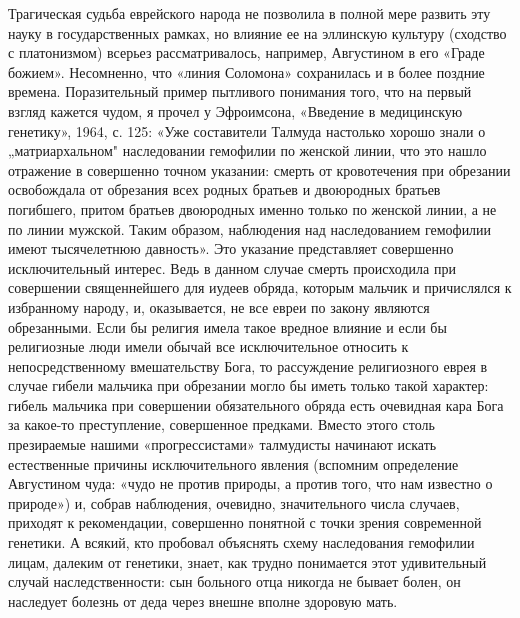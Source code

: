 Трагическая судьба еврейского народа не позволила в полной мере развить эту
науку в государственных рамках, но влияние ее на эллинскую культуру (сходство с
платонизмом) всерьез рассматривалось, например, Августином в его «Граде
божием». Несомненно, что «линия Соломона» сохранилась и в более поздние
времена. Поразительный пример пытливого понимания того, что на первый взгляд
кажется чудом, я прочел у Эфроимсона, «Введение в медицинскую генетику», 1964,
с. 125: «Уже составители Талмуда настолько хорошо знали о „матриархальном"
наследовании гемофилии по женской линии, что это нашло отражение в совершенно
точном указании: смерть от кровотечения при обрезании освобождала от обрезания
всех родных братьев и двоюродных братьев погибшего, притом братьев двоюродных
именно только по женской линии, а не по линии мужской. Таким образом,
наблюдения над наследованием гемофилии имеют тысячелетнюю давность». Это
указание представляет совершенно исключительный интерес. Ведь в данном случае
смерть происходила при совершении священнейшего для иудеев обряда, которым
мальчик и причислялся к избранному народу, и, оказывается, не все евреи по
закону являются обрезанными. Если бы религия имела такое вредное влияние и если
бы религиозные люди имели обычай все исключительное относить к
непосредственному вмешательству Бога, то рассуждение религиозного еврея в
случае гибели мальчика при обрезании могло бы иметь только такой характер:
гибель мальчика при совершении обязательного обряда есть очевидная кара Бога за
какое-то преступление, совершенное предками. Вместо этого столь презираемые
нашими «прогрессистами» талмудисты начинают искать естественные причины
исключительного явления (вспомним определение Августином чуда: «чудо не против
природы, а против того, что нам известно о природе») и, собрав наблюдения,
очевидно, значительного числа случаев, приходят к рекомендации, совершенно
понятной с точки зрения современной генетики. А всякий, кто пробовал объяснять
схему наследования гемофилии лицам, далеким от генетики, знает, как трудно
понимается этот удивительный случай наследственности: сын больного отца никогда
не бывает болен, он наследует болезнь от деда через внешне вполне здоровую
мать.


